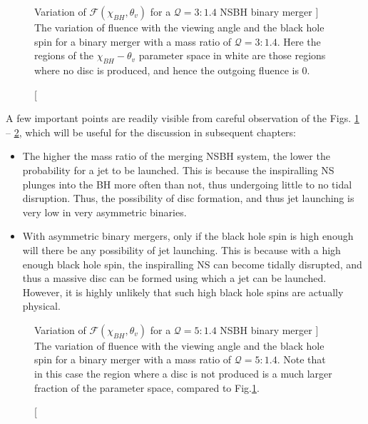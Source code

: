     \begin{figure}[H]
        \centering
        \def\svgwidth{0.8\linewidth}
        
        \caption
        [
            Variation of $\mathcal{F}(\chi_{BH}, \theta_{v})$ for a $\mathcal{Q}=3:1.4$
            NSBH binary merger
        ]
        {
            The variation of fluence with the viewing angle and the black hole spin for
            a binary merger with a mass ratio of $\mathcal{Q}=3:1.4$. Here the regions
            of the $\chi_{BH}-\theta_v$ parameter space in white are those regions where
            no disc is produced, and hence the outgoing fluence is 0.
        }
        \label{fig:fluence_thetav+spin(3)}
    \end{figure}

    A few important points are readily visible from careful observation of the Figs.
    \ref{fig:fluence_thetav+spin(3)} -- \ref{fig:fluence_thetav+spin(5)}, which will be
    useful for the discussion in subsequent chapters:

    \begin{itemize}

        \item The higher the mass ratio of the merging NSBH system, the lower the
            probability for a jet to be launched. This is because the inspiralling NS
            plunges into the BH more often than not, thus undergoing little to no tidal
            disruption. Thus, the possibility of disc formation, and thus jet launching
            is very low in very asymmetric binaries.

        \item With asymmetric binary mergers, only if the black hole spin is high enough
            will there be any possibility of jet launching. This is because with a high
            enough black hole spin, the inspiralling NS can become tidally disrupted,
            and thus a massive disc can be formed using which a jet can be launched.
            However, it is highly unlikely that such high black hole spins are actually
            physical.

    \end{itemize}

    \begin{figure}[H]
        \centering
        \def\svgwidth{0.8\linewidth}
        
        \caption
        [
            Variation of $\mathcal{F}(\chi_{BH}, \theta_{v})$ for a $\mathcal{Q}=5:1.4$
            NSBH binary merger
        ]
        {
            The variation of fluence with the viewing angle and the black hole spin for
            a binary merger with a mass ratio of $\mathcal{Q}=5:1.4$. Note that in this
            case the region where a disc is not produced is a much larger fraction of
            the parameter space, compared to Fig.\ref{fig:fluence_thetav+spin(3)}.
        }
        \label{fig:fluence_thetav+spin(5)}
    \end{figure}

